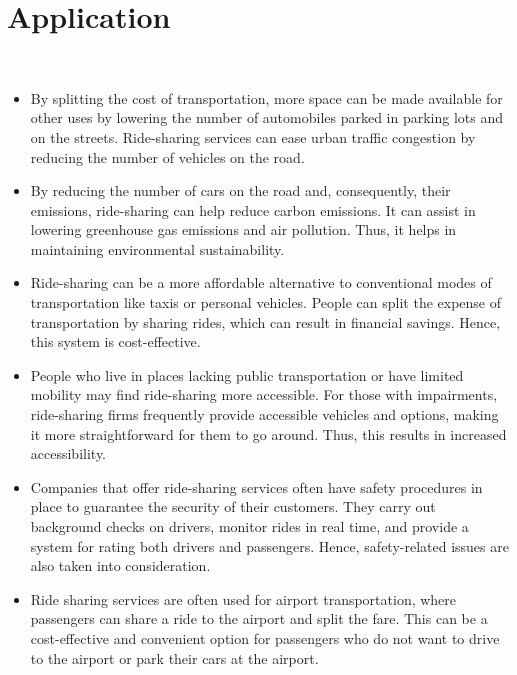 \documentclass{article}
\begin{document}
\newpage
\section{Application} \\
\begin{itemize}
\large
    \item By splitting the cost of transportation, more space can be made available for other uses by lowering the number of automobiles parked in parking lots and on the streets. Ride-sharing services can ease urban traffic congestion by reducing the number of vehicles on the road.   \\

    \item By reducing the number of cars on the road and, consequently, their emissions, ride-sharing can help reduce carbon emissions. It can assist in lowering greenhouse gas emissions and air pollution. Thus, it helps in maintaining environmental sustainability. \\

    \item Ride-sharing can be a more affordable alternative to conventional modes of transportation like taxis or personal vehicles. People can split the expense of transportation by sharing rides, which can result in financial savings. Hence, this system is cost-effective.\\

    \item People who live in places lacking public transportation or have limited mobility may find ride-sharing more accessible. For those with impairments, ride-sharing firms frequently provide accessible vehicles and options, making it more straightforward for them to go around. Thus, this results in increased accessibility.  \\

    \item Companies that offer ride-sharing services often have safety procedures in place to guarantee the security of their customers. They carry out background checks on drivers, monitor rides in real time, and provide a system for rating both drivers and passengers. Hence, safety-related issues are also taken into consideration. \\

    \item Ride sharing services are often used for airport transportation, where passengers can share a ride to the airport and split the fare. This can be a cost-effective and convenient option for passengers who do not want to drive to the airport or park their cars at the airport. \\


\end{itemize}
\end{document}
